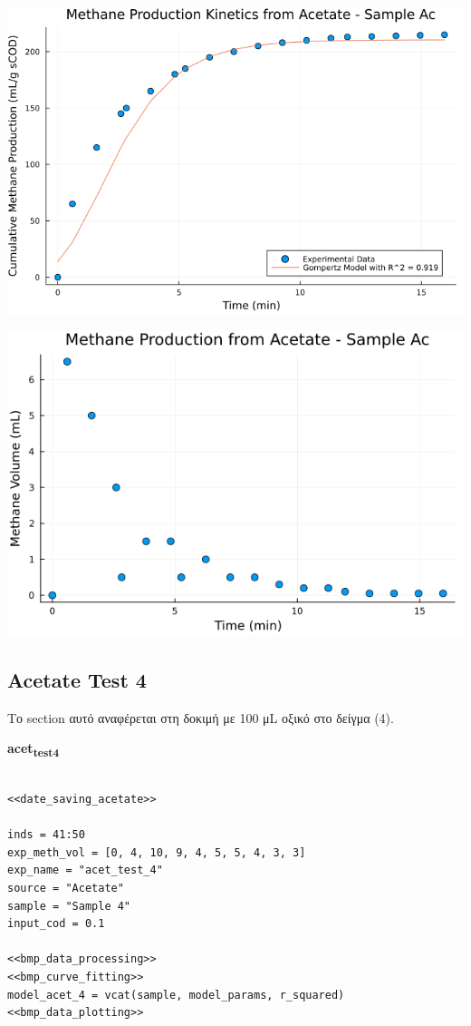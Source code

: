 \documentclass[11pt]{article}
\begin{document}
\begin{center}
\includegraphics[width=.9\linewidth]{../plots/BMPs/Acetate/methane_kinetics_acet_test_ac.png}
\end{center}

\begin{center}
\includegraphics[width=.9\linewidth]{../plots/BMPs/Acetate/acet_test_ac_min.png}
\end{center}

\subsection{Acetate Test 4}
\label{sec:orgad607e7}
Το section αυτό αναφέρεται στη δοκιμή με 100 μL οξικό στο δείγμα (4).

\textbf{acet\textsubscript{test}\textsubscript{4}}
\begin{verbatim}

<<date_saving_acetate>>

inds = 41:50
exp_meth_vol = [0, 4, 10, 9, 4, 5, 5, 4, 3, 3]
exp_name = "acet_test_4"
source = "Acetate"
sample = "Sample 4"
input_cod = 0.1

<<bmp_data_processing>>
<<bmp_curve_fitting>>
model_acet_4 = vcat(sample, model_params, r_squared)
<<bmp_data_plotting>>
\end{verbatim}
\end{document}

